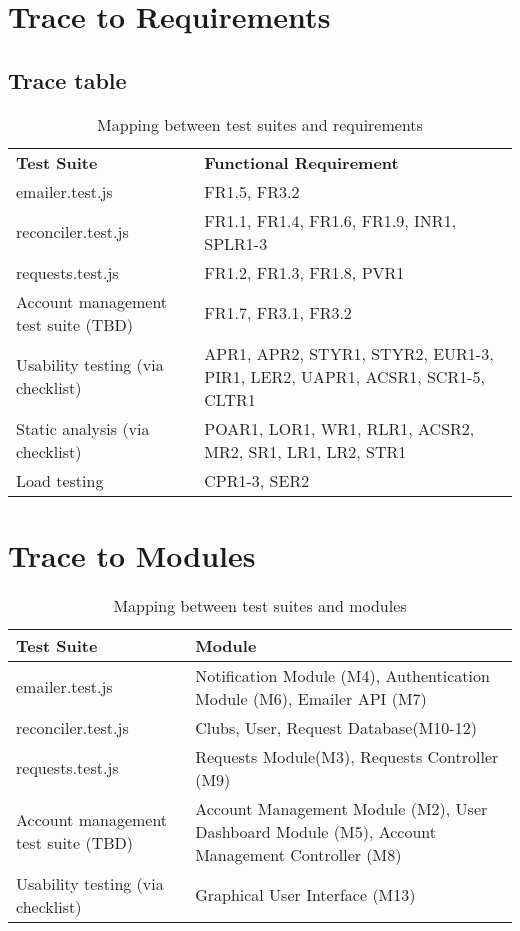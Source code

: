 \documentclass[12pt, titlepage]{article}
\begin{document}
\section{Trace to Requirements}
\subsection{Trace table}
\begin{table}[!h]
\begin{tabularx}{\textwidth}{p{5cm}p{5cm}}
\toprule {\bf Test Suite} & {\bf Functional Requirement}\\
  emailer.test.js & FR1.5, FR3.2\\
  reconciler.test.js & FR1.1, FR1.4, FR1.6, FR1.9, INR1, SPLR1-3\\
  requests.test.js & FR1.2, FR1.3, FR1.8, PVR1\\ 
  Account management test suite (TBD) & FR1.7, FR3.1, FR3.2\\
  Usability testing (via checklist) & APR1, APR2, STYR1, STYR2, EUR1-3, PIR1, LER2, UAPR1, ACSR1, SCR1-5, CLTR1\\
  Static analysis (via checklist) & POAR1, LOR1, WR1, RLR1, ACSR2, MR2, SR1, LR1, LR2, STR1\\
  Load testing & CPR1-3, SER2\\
\end{tabularx}
\caption{Mapping between test suites and requirements}
\end{table}
\newpage


\section{Trace to Modules}
\begin{table}[!h]
\begin{tabularx}{\textwidth}{p{5cm}p{5cm}}
\toprule {\bf Test Suite} & {\bf Module}\\
\midrule 
emailer.test.js & Notification Module (M4), Authentication Module (M6), Emailer API (M7)\\
reconciler.test.js & Clubs, User, Request Database(M10-12)\\
requests.test.js & Requests Module(M3), Requests Controller (M9)\\
Account management test suite (TBD) & Account Management Module (M2), User Dashboard Module (M5), Account Management Controller (M8)\\
Usability testing (via checklist) & Graphical User Interface (M13)\\
\bottomrule
\end{tabularx}
\caption{Mapping between test suites and modules}
\end{table}
\end{document}
